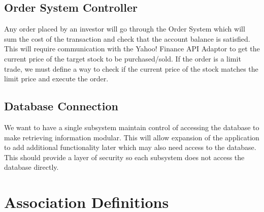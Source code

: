 \subsection{Order System Controller}
Any order placed by an investor will go through the Order System which will
sum the cost of the transaction and check that the account balance is satisfied.
This will require communication with the Yahoo! Finance API Adaptor to get the
current price of the target stock to be purchased/sold. If the order is a limit
trade, we must define a way to check if the current price of the stock matches
the limit price and execute the order.\\

\subsection{Database Connection}
We want to have a single subsystem maintain control of accessing the database
to make retrieving information modular. This will allow expansion of the
application to add additional functionality later which may also need access
to the database. This should provide a layer of security so each subsystem does
not access the database directly.\\

\newpage
\section{Association Definitions}

